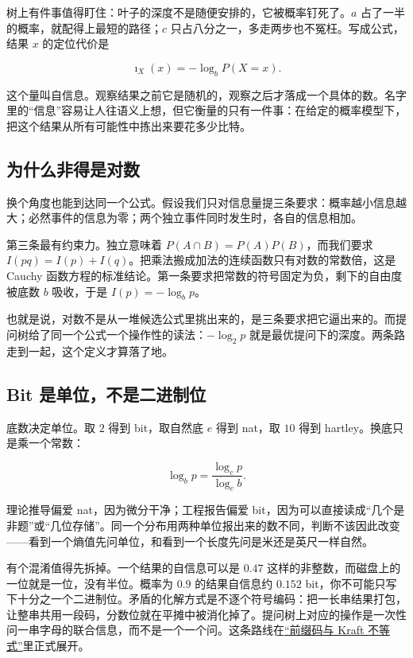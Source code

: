 树上有件事值得盯住：叶子的深度不是随便安排的，它被概率钉死了。\(a\) 占了一半的概率，就配得上最短的路径；\(c\) 只占八分之一，多走两步也不冤枉。写成公式，结果 \(x\) 的定位代价是

\[
\imath_X(x)=-\log_b P(X=x).
\]

这个量叫自信息。观察结果之前它是随机的，观察之后才落成一个具体的数。名字里的``信息''容易让人往语义上想，但它衡量的只有一件事：在给定的概率模型下，把这个结果从所有可能性中拣出来要花多少比特。

\subsection{为什么非得是对数}

换个角度也能到达同一个公式。假设我们只对信息量提三条要求：概率越小信息越大；必然事件的信息为零；两个独立事件同时发生时，各自的信息相加。

第三条最有约束力。独立意味着 \(P(A\cap B)=P(A)P(B)\)，而我们要求 \(I(pq)=I(p)+I(q)\)。把乘法搬成加法的连续函数只有对数的常数倍，这是 Cauchy 函数方程的标准结论。第一条要求把常数的符号固定为负，剩下的自由度被底数 \(b\) 吸收，于是 \(I(p)=-\log_b p\)。

也就是说，对数不是从一堆候选公式里挑出来的，是三条要求把它逼出来的。而提问树给了同一个公式一个操作性的读法：\(-\log_2 p\) 就是最优提问下的深度。两条路走到一起，这个定义才算落了地。

\subsection{Bit 是单位，不是二进制位}

底数决定单位。取 \(2\) 得到 bit，取自然底 \(e\) 得到 nat，取 \(10\) 得到 hartley。换底只是乘一个常数：

\[
\log_b p=\frac{\log_c p}{\log_c b}.
\]

理论推导偏爱 nat，因为微分干净；工程报告偏爱 bit，因为可以直接读成``几个是非题''或``几位存储''。同一个分布用两种单位报出来的数不同，判断不该因此改变——看到一个熵值先问单位，和看到一个长度先问是米还是英尺一样自然。

有个混淆值得先拆掉。一个结果的自信息可以是 \(0.47\) 这样的非整数，而磁盘上的一位就是一位，没有半位。概率为 \(0.9\) 的结果自信息约 \(0.152\) bit，你不可能只写下十分之一个二进制位。矛盾的化解方式是不逐个符号编码：把一长串结果打包，让整串共用一段码，分数位就在平摊中被消化掉了。提问树上对应的操作是一次性问一串字母的联合信息，而不是一个一个问。这条路线在\hyperref[sec:07-Information-Theory/04-Source-Coding/01]{``前缀码与 Kraft 不等式''}里正式展开。

